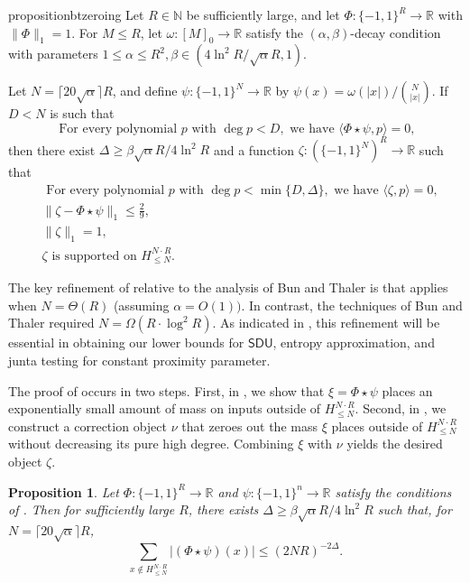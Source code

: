 \documentclass[11pt, letterpaper, fleqn]{article}
\newtheorem{proposition}[theorem]{Proposition}
\theoremstyle{plain}
\newcommand{\R}{\mathbb{R}}
\newcommand{\SDU}{\mathsf{ SDU}}
\newcommand{\bits}{\{-1,1\}}
\newcommand{\ls}{\star}
\newcommand{\N}{\mathbb{N}}
\begin{document}
\begin{restatable}{proposition}{btzeroing} \label{prop:btzeroing}
Let $R \in \N$ be sufficiently large, and let $\Phi : \bits^R \to \R$ with $\|\Phi\|_1 = 1$. For $M \le R$, let $\omega : [M]_0 \to \R$ satisfy the $(\alpha, \beta)$-decay condition with parameters $1 \leq \alpha \le R^2, \beta \in (4\ln^2 R/ \sqrt{\alpha} R, 1)$.

Let $N = \lceil 20 \sqrt{\alpha} \rceil R$, and define $\psi: \bits^N \to \R$ by $\psi(x) = \omega(|x|) / \binom{N}{|x|}$. If $D < N$ is such that
\begin{equation}
\text{ For every polynomial } p \text{ with } \deg p < D, \text{ we have } \langle \Phi \ls \psi, p \rangle = 0, \label{eqn:prelim-phd}
\end{equation}
then there exist $\Delta \ge \beta\sqrt{\alpha} R / 4\ln^2 R$ and a function $\zeta: (\bits^N)^R \to \R$ such that
\begin{align}& \text{ For every polynomial } p \text{ with } \deg p < \min\{D, \Delta\}, \text{ we have } \langle \zeta, p \rangle = 0, \label{eqn:final-phd} \\
&\|\zeta - \Phi \ls \psi\|_1 \le \frac{2}{9}, \label{eqn:final-corr} \\
&\|\zeta\|_1 = 1, \label{eqn:final-norm}\\
&\zeta \text{ is supported on } H^{N \cdot R}_{\le N}. \label{eqn:final-support}
\end{align}
\end{restatable}

The key refinement of  relative to the analysis of Bun and Thaler
is that  applies when $N=\Theta(R)$ (assuming $\alpha=O(1))$. In contrast, the techniques of Bun and Thaler required $N=\Omega(R \cdot \log^2 R)$. As indicated in , this refinement will be essential in obtaining our lower bounds for $\SDU$, entropy approximation, and junta testing for constant proximity parameter.

The proof of  occurs in two steps. First, in , we show that $\xi = \Phi \ls \psi$ places an exponentially small amount of mass on inputs outside of $H_{\le N}^{N \cdot R}$. Second, in , we construct a correction object $\nu$ that zeroes out the mass $\xi$ places outside of $H_{\le N}^{N \cdot R}$ without decreasing its pure high degree. Combining $\xi$ with $\nu$ yields the desired object $\zeta$.

\begin{proposition} \label{prop:prelim-mass}
Let $\Phi : \bits^R \to \R$ and $\psi : \bits^n \to \R$ satisfy the conditions of . Then for sufficiently large $R$, there exists $\Delta \ge \beta \sqrt{\alpha} R / 4\ln^2 R$ such that, for $N = \lceil 20 \sqrt{\alpha} \rceil R$,
\begin{equation}
\sum_{x \notin H_{\le N}^{N \cdot R}} |(\Phi \ls \psi)(x)| \le (2NR)^{-2\Delta}. \label{eqn:prelim-mass}
\end{equation}
\end{proposition}
\end{document}
